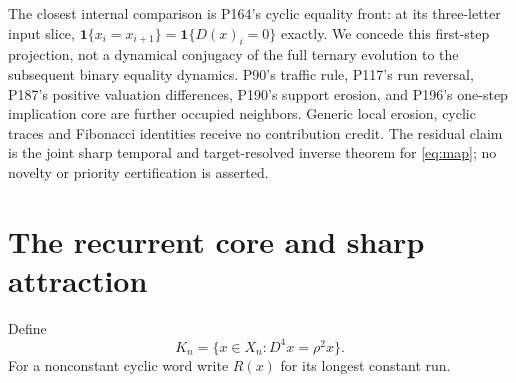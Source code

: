 \documentclass[a4paper,10pt]{amsart}
\theoremstyle{remark}
\begin{document}
The closest internal comparison is P164's cyclic equality front: at its
three-letter input slice, $\mathbf1\{x_i=x_{i+1}\}=\mathbf1\{D(x)_i=0\}$
exactly. We concede this first-step projection, not a dynamical conjugacy
of the full ternary evolution to the subsequent binary equality dynamics.
P90's traffic rule, P117's run reversal, P187's positive valuation
differences, P190's support erosion, and P196's one-step implication core
are further occupied neighbors. Generic local erosion, cyclic traces and
Fibonacci identities receive no contribution credit. The residual claim is
the joint sharp temporal and target-resolved inverse theorem for
\eqref{eq:map}; no novelty or priority certification is asserted.

\section{The recurrent core and sharp attraction}
Define
\begin{equation}\label{eq:core}
K_n=\{x\in X_n:D^4x=\rho^2x\}.
\end{equation}
For a nonconstant cyclic word write $R(x)$ for its longest constant run.
\end{document}
